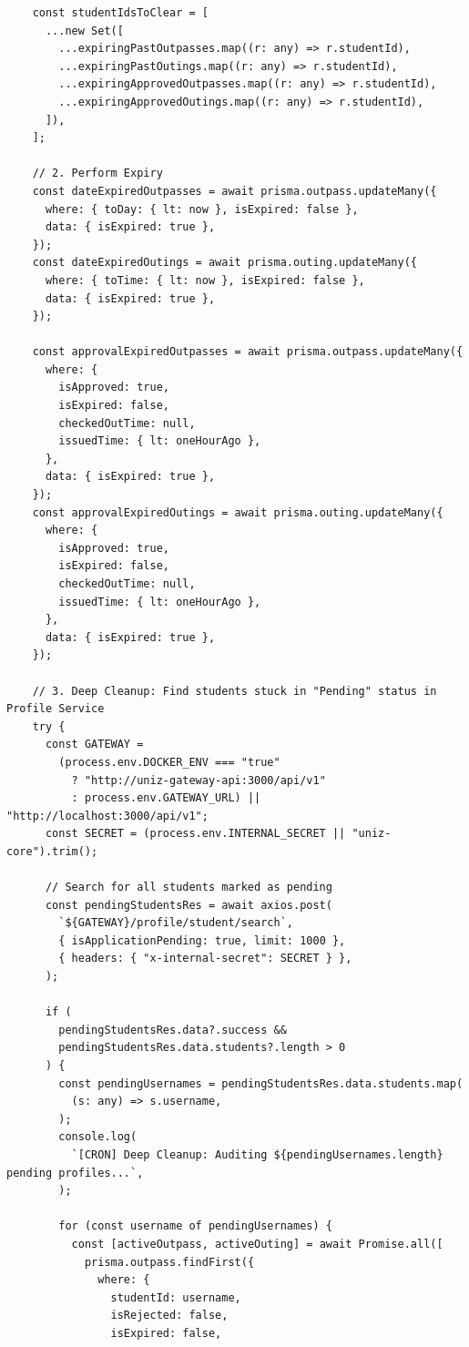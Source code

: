 \documentclass[11pt,a4paper,oneside]{article}
\begin{document}
\begin{lstlisting}
    const studentIdsToClear = [
      ...new Set([
        ...expiringPastOutpasses.map((r: any) => r.studentId),
        ...expiringPastOutings.map((r: any) => r.studentId),
        ...expiringApprovedOutpasses.map((r: any) => r.studentId),
        ...expiringApprovedOutings.map((r: any) => r.studentId),
      ]),
    ];

    // 2. Perform Expiry
    const dateExpiredOutpasses = await prisma.outpass.updateMany({
      where: { toDay: { lt: now }, isExpired: false },
      data: { isExpired: true },
    });
    const dateExpiredOutings = await prisma.outing.updateMany({
      where: { toTime: { lt: now }, isExpired: false },
      data: { isExpired: true },
    });

    const approvalExpiredOutpasses = await prisma.outpass.updateMany({
      where: {
        isApproved: true,
        isExpired: false,
        checkedOutTime: null,
        issuedTime: { lt: oneHourAgo },
      },
      data: { isExpired: true },
    });
    const approvalExpiredOutings = await prisma.outing.updateMany({
      where: {
        isApproved: true,
        isExpired: false,
        checkedOutTime: null,
        issuedTime: { lt: oneHourAgo },
      },
      data: { isExpired: true },
    });

    // 3. Deep Cleanup: Find students stuck in "Pending" status in Profile Service
    try {
      const GATEWAY =
        (process.env.DOCKER_ENV === "true"
          ? "http://uniz-gateway-api:3000/api/v1"
          : process.env.GATEWAY_URL) || "http://localhost:3000/api/v1";
      const SECRET = (process.env.INTERNAL_SECRET || "uniz-core").trim();

      // Search for all students marked as pending
      const pendingStudentsRes = await axios.post(
        `${GATEWAY}/profile/student/search`,
        { isApplicationPending: true, limit: 1000 },
        { headers: { "x-internal-secret": SECRET } },
      );

      if (
        pendingStudentsRes.data?.success &&
        pendingStudentsRes.data.students?.length > 0
      ) {
        const pendingUsernames = pendingStudentsRes.data.students.map(
          (s: any) => s.username,
        );
        console.log(
          `[CRON] Deep Cleanup: Auditing ${pendingUsernames.length} pending profiles...`,
        );

        for (const username of pendingUsernames) {
          const [activeOutpass, activeOuting] = await Promise.all([
            prisma.outpass.findFirst({
              where: {
                studentId: username,
                isRejected: false,
                isExpired: false,

\end{lstlisting}
\end{document}
